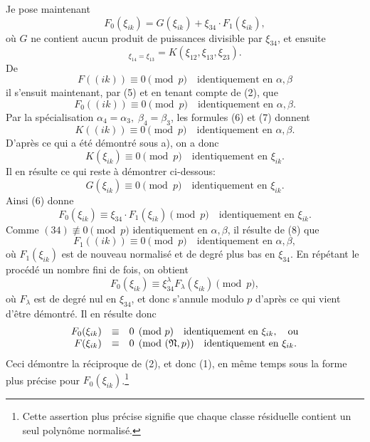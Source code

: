 Je pose maintenant
\begin{equation}
        F_0(\xi_{ik})=G(\xi_{ik})+\xi_{34}\cdot F_1(\xi_{ik}),
\end{equation}
où $G$ ne contient aucun produit de puissances divisible par $\xi_{34}$, et ensuite
\begin{equation}
        [G]_{\xi_{14}=\xi_{13}}=K(\xi_{12},\xi_{13},\xi_{23}).
\end{equation}
De
\[
        F((ik))\equiv0\pmod p\quad \text{identiquement en $\alpha,\beta$}
\]
il s'ensuit maintenant, par (5) et en tenant compte de (2), que
\begin{equation}
        F_0((ik))\equiv0\pmod p\quad \text{identiquement en $\alpha,\beta$}.
\end{equation}
Par la spécialisation $\alpha_4=\alpha_3,\;\beta_4=\beta_3$, les formules (6) et (7) donnent
\[
        K((ik))\equiv0\pmod p\quad \text{identiquement en $\alpha,\beta$}.
\]
D'après ce qui a été démontré sous a), on a donc
\[
        K(\xi_{ik})\equiv0\pmod p\quad \text{identiquement en $\xi_{ik}$}.
\]
Il en résulte ce qui reste à démontrer ci-dessous:
\[
        G(\xi_{ik})\equiv0\pmod p\quad \text{identiquement en $\xi_{ik}$}.
\]
Ainsi (6) donne
\[
        F_0(\xi_{ik})\equiv \xi_{34}\cdot F_1(\xi_{ik})\pmod p
        \quad \text{identiquement en $\xi_{ik}$}.
\]
Comme $(34)\not\equiv0\pmod p$ identiquement en $\alpha,\beta$, il résulte de (8) que
\[
        F_1((ik))\equiv0\pmod p\quad \text{identiquement en $\alpha,\beta$},
\]
où $F_1(\xi_{ik})$ est de nouveau normalisé et de degré plus bas en $\xi_{34}$. En répétant le procédé un nombre fini de fois, on obtient
\[
        F_0(\xi_{ik})\equiv\xi_{34}^{\lambda}F_\lambda(\xi_{ik})\pmod p,
\]
où $F_\lambda$ est de degré nul en $\xi_{34}$, et donc s'annule modulo $p$ d'après ce qui vient d'être démontré. Il en résulte donc
\begin{equation}
\begin{array}{rcl}
        F_0(\xi_{ik})&\equiv&0\pmod p\quad \text{identiquement en $\xi_{ik}$},\quad\text{ou}\\
        F(\xi_{ik})&\equiv&0\pmod{(\mathfrak N,p)}\quad \text{identiquement en $\xi_{ik}$}.
\end{array}
\end{equation}
Ceci démontre la réciproque de (2), et donc (1), en même temps sous la forme plus précise pour $F_0(\xi_{ik})$.\footnote{Cette assertion plus précise signifie que chaque classe résiduelle contient un seul polynôme normalisé.}

